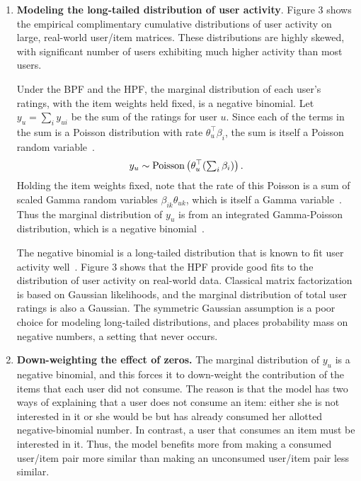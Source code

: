\begin{enumerate}
\item {\bf Modeling the long-tailed distribution of user activity}.
Figure 3 shows the empirical complimentary cumulative distributions of
user activity on large, real-world user/item matrices. These
distributions are highly skewed, with significant number of users
exhibiting much higher activity than most users. 

Under the BPF and the HPF, the marginal distribution of each user's
ratings, with the item weights held fixed, is a negative binomial.
Let $y_{u} = \sum_{i} y_{ui}$ be the sum of the ratings for user $u$.
Since each of the terms in the sum is a Poisson distribution with rate
$\theta_u^\top \beta_i$, the sum is itself a Poisson random
variable~\cite{Johnson:2005}.
\begin{equation}
  y_u \sim \textrm{Poisson}\left(\theta_u^\top (\textstyle \sum_{i} \beta_{i})\right).
\end{equation}
Holding the item weights fixed, note that the rate of this Poisson is
a sum of scaled Gamma random variables $\beta_{ik} \theta_{uk}$, which
is itself a Gamma variable~\cite{Norman:1994}.  Thus the marginal
distribution of $y_u$ is from an integrated Gamma-Poisson
distribution, which is a negative binomial~\cite{Gelman:1995}.

The negative binomial is a long-tailed distribution that is known to
fit user activity well~\cite{Goodhardt:1984,Dunn1983}.  Figure 3 shows
that the HPF provide good fits to the distribution of user activity on
real-world data.  Classical matrix factorization is based on Gaussian
likelihoods, and the marginal distribution of total user ratings is
also a Gaussian.  The symmetric Gaussian assumption is a poor choice
for modeling long-tailed distributions, and places probability mass on
negative numbers, a setting that never occurs.


\item {\bf Down-weighting the effect of zeros.}
The marginal distribution of $y_u$ is a negative binomial, and this
forces it to down-weight the contribution of the items that each user
did not consume. The reason is that the model has two ways of
explaining that a user does not consume an item: either she is not
interested in it or she would be but has already consumed her allotted
negative-binomial number.  In contrast, a user that consumes an item
must be interested in it.  Thus, the model benefits more from making a
consumed user/item pair more similar than making an unconsumed
user/item pair less similar.


\end{enumerate}
